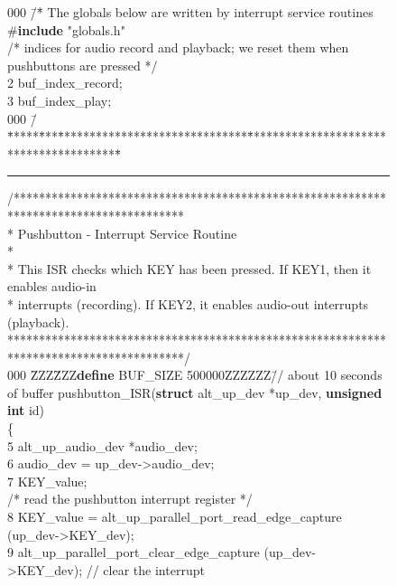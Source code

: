 \documentclass[11pt, twoside, pdftex]{article}
\begin{document}
\begin{figure}[h!]
\begin{center}
\begin{minipage}[t]{12.5 cm}
\begin{tabbing}
000 \=/\=* The globals below are written by interrupt service routines \>\#{\bf include} "globals.h"\\
\>/* indices for audio record and playback; we reset them when pushbuttons are pressed */\\
2 buf\_index\_record;\\
3 buf\_index\_play;\\
000 \=/\=*****\=***\=******************************\=****************************************\=\kill
\rule{6.0in}{0in} 
\>/***************************************************************************************\\
\>\>* Pushbutton - Interrupt Service Routine                                \\
\>\>*                                                                          \\
\>\>* This ISR checks which KEY has been pressed. If KEY1, then it enables audio-in\\
\>\>* interrupts (recording). If KEY2, it enables audio-out interrupts (playback).\\
\>\>****************************************************************************************/\\
000 \=ZZZ\=ZZZ\={\bf define} BUF\_SIZE 500000ZZZZZZ\=// about 10 seconds of buffer   pushbutton\_ISR({\bf struct} alt\_up\_dev *up\_dev, {\bf unsigned int} id)\\
\>\{\\
5 \>\>alt\_up\_audio\_dev *audio\_dev;\\
6 \>\>audio\_dev = up\_dev->audio\_dev;\\
7 \> KEY\_value;\\
\>\>/* read the pushbutton interrupt register */\\
8 \>\>KEY\_value = alt\_up\_parallel\_port\_read\_edge\_capture (up\_dev->KEY\_dev);\\
9 \>\>alt\_up\_parallel\_port\_clear\_edge\_capture (up\_dev->KEY\_dev);	// clear the interrupt\\
 

\end{tabbing}
\end{minipage}
\end{center}
\end{figure}
\end{document}
